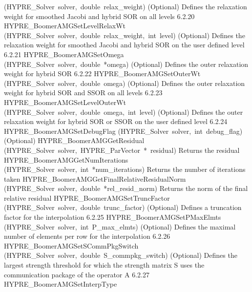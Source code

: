 \documentclass{article}
\begin{document}
\begin{cxxentry}
\begin{cxxentry}
\begin{cxxnames}
        {(HYPRE\_Solver\ solver,\ double\ relax\_weight)}
        {
(Optional) Defines the relaxation weight for smoothed Jacobi and hybrid SOR 
on all levels}
        {6.2.20}
        {HYPRE\_BoomerAMGSetLevelRelaxWt}
        {(HYPRE\_Solver\ solver,\ double\ relax\_weight,\ int\ level)}
        {
(Optional) Defines the relaxation weight for smoothed Jacobi and hybrid SOR
on the user defined level}
        {6.2.21}
        {HYPRE\_BoomerAMGSetOmega}
        {(HYPRE\_Solver\ solver,\ double\ *omega)}
        {
(Optional) Defines the outer relaxation weight for hybrid SOR}
        {6.2.22}
        {HYPRE\_BoomerAMGSetOuterWt}
        {(HYPRE\_Solver\ solver,\ double\ omega)}
        {
(Optional) Defines the outer relaxation weight for hybrid SOR and SSOR
on all levels}
        {6.2.23}
        {HYPRE\_BoomerAMGSetLevelOuterWt}
        {(HYPRE\_Solver\ solver,\ double\ omega,\ int\ level)}
        {
(Optional) Defines the outer relaxation weight for hybrid SOR or SSOR
on the user defined level}
        {6.2.24}
        {HYPRE\_BoomerAMGSetDebugFlag}
        {(HYPRE\_Solver\ solver,\ int\ debug\_flag)}
        {
(Optional)}
        {}
\label{cxx.6.2.58}
        {HYPRE\_BoomerAMGGetResidual}
        {(HYPRE\_Solver\ solver,\ HYPRE\_ParVector\ *\ residual)}
        {
Returns the residual}
        {}
\label{cxx.6.2.59}
        {HYPRE\_BoomerAMGGetNumIterations}
        {(HYPRE\_Solver\ solver,\ int\ *num\_iterations)}
        {
Returns the number of iterations taken}
        {}
\label{cxx.6.2.60}
        {HYPRE\_BoomerAMGGetFinalRelativeResidualNorm}
        {(HYPRE\_Solver\ solver,\ double\ *rel\_resid\_norm)}
        {
Returns the norm of the final relative residual}
        {}
\label{cxx.6.2.61}
        {HYPRE\_BoomerAMGSetTruncFactor}
        {(HYPRE\_Solver\ solver,\ double\ trunc\_factor)}
        {
(Optional) Defines a truncation factor for the interpolation}
        {6.2.25}
        {HYPRE\_BoomerAMGSetPMaxElmts}
        {(HYPRE\_Solver\ solver,\ int\ P\_max\_elmts)}
        {
(Optional) Defines the maximal number of elements per row for the interpolation}
        {6.2.26}
        {HYPRE\_BoomerAMGSetSCommPkgSwitch}
        {(HYPRE\_Solver\ solver,\ double\ S\_commpkg\_switch)}
        {
(Optional) Defines the largest strength threshold for which 
the strength matrix S uses the communication package of the operator A}
        {6.2.27}
        {HYPRE\_BoomerAMGSetInterpType}

\end{cxxnames}
\end{cxxentry}
\end{cxxentry}
\end{document}
